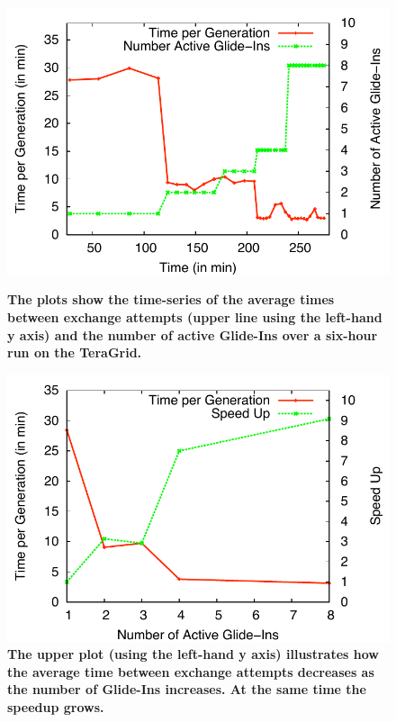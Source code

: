 \documentclass{rspublic}
\begin{document}
\begin{figure}[h]
  \begin{minipage}[t]{.495\textwidth}
    \begin{center}  
      \includegraphics[width=\textwidth]{perf_repex}
      \caption{\footnotesize \bf The plots show the time-series of the
        average times between exchange attempts (upper line using the
        left-hand y axis) and the number of active Glide-Ins over a
        six-hour run on the TeraGrid.}
      \label{fig:result_A}
    \end{center}
  \end{minipage}
  \hfill
  \begin{minipage}[t]{.48\textwidth}
    \begin{center}  
      \includegraphics[width=\textwidth]{perf_repex2}
      \caption{\footnotesize \bf The upper plot (using the left-hand
        y axis) illustrates how the average time between exchange attempts
        decreases as the number of Glide-Ins increases. At the same time
        the speedup grows.}
      \label{fig:result_B}
    \end{center}
  \end{minipage}
  \hfill
\end{figure}             
\end{document}
